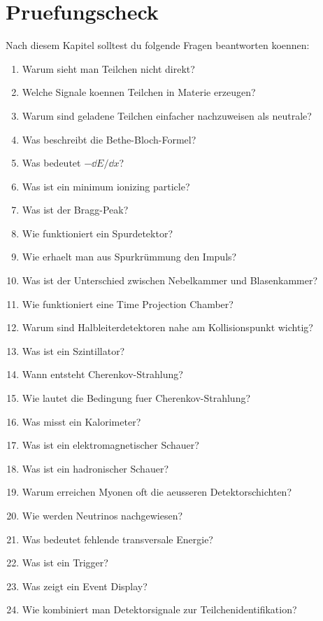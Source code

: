 \section{Pruefungscheck}

\begin{examtipbox}
Nach diesem Kapitel solltest du folgende Fragen beantworten koennen:
\begin{enumerate}
    \item Warum sieht man Teilchen nicht direkt?
    \item Welche Signale koennen Teilchen in Materie erzeugen?
    \item Warum sind geladene Teilchen einfacher nachzuweisen als neutrale?
    \item Was beschreibt die Bethe-Bloch-Formel?
    \item Was bedeutet $-\dd E/\dd x$?
    \item Was ist ein minimum ionizing particle?
    \item Was ist der Bragg-Peak?
    \item Wie funktioniert ein Spurdetektor?
    \item Wie erhaelt man aus Spurkrümmung den Impuls?
    \item Was ist der Unterschied zwischen Nebelkammer und Blasenkammer?
    \item Wie funktioniert eine Time Projection Chamber?
    \item Warum sind Halbleiterdetektoren nahe am Kollisionspunkt wichtig?
    \item Was ist ein Szintillator?
    \item Wann entsteht Cherenkov-Strahlung?
    \item Wie lautet die Bedingung fuer Cherenkov-Strahlung?
    \item Was misst ein Kalorimeter?
    \item Was ist ein elektromagnetischer Schauer?
    \item Was ist ein hadronischer Schauer?
    \item Warum erreichen Myonen oft die aeusseren Detektorschichten?
    \item Wie werden Neutrinos nachgewiesen?
    \item Was bedeutet fehlende transversale Energie?
    \item Was ist ein Trigger?
    \item Was zeigt ein Event Display?
    \item Wie kombiniert man Detektorsignale zur Teilchenidentifikation?
\end{enumerate}
\end{examtipbox}